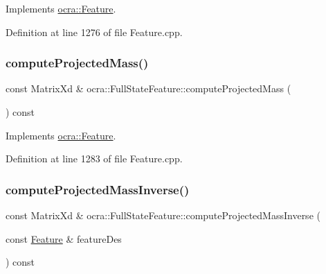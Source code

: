 Implements \hyperlink{classocra_1_1Feature_a44e11dd349e92971fefebff354e7214b}{ocra\+::\+Feature}.



Definition at line 1276 of file Feature.\+cpp.

\hypertarget{classocra_1_1FullStateFeature_a5f2a243a7df81e7843bc258bef9cfae8}{}\label{classocra_1_1FullStateFeature_a5f2a243a7df81e7843bc258bef9cfae8} 
\subsubsection{\texorpdfstring{compute\+Projected\+Mass()}{computeProjectedMass()}\hspace{0.1cm}{\footnotesize\ttfamily [2/2]}}
{\footnotesize\ttfamily const Matrix\+Xd \& ocra\+::\+Full\+State\+Feature\+::compute\+Projected\+Mass (\begin{DoxyParamCaption}{ }\end{DoxyParamCaption}) const\hspace{0.3cm}{\ttfamily [virtual]}}



Implements \hyperlink{classocra_1_1Feature_a99ac023809c0cf34b5d582537934b08c}{ocra\+::\+Feature}.



Definition at line 1283 of file Feature.\+cpp.

\hypertarget{classocra_1_1FullStateFeature_a53b841962a372665dbd0ec7a94c4cd74}{}\label{classocra_1_1FullStateFeature_a53b841962a372665dbd0ec7a94c4cd74} 
\subsubsection{\texorpdfstring{compute\+Projected\+Mass\+Inverse()}{computeProjectedMassInverse()}\hspace{0.1cm}{\footnotesize\ttfamily [1/2]}}
{\footnotesize\ttfamily const Matrix\+Xd \& ocra\+::\+Full\+State\+Feature\+::compute\+Projected\+Mass\+Inverse (\begin{DoxyParamCaption}\item[{const \hyperlink{classocra_1_1Feature}{Feature} \&}]{feature\+Des }\end{DoxyParamCaption}) const\hspace{0.3cm}{\ttfamily [virtual]}}



